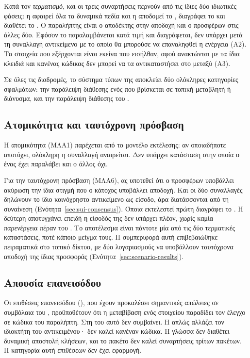 Κατά τον \emph{τερματισμό}, και οι τρεις συναρτήσεις περνούν από τις ίδιες δύο ιδιωτικές
φάσεις: η  αφαιρεί όλα τα δυναμικά πεδία και η 
αποδομεί το , διαγράφει το  και διαθέτει το . Ο παραλήπτης είναι ο αποδέκτης στην αποδοχή και ο προσφέρων στις άλλες
δύο. Εφόσον το  παραλαμβάνεται κατά τιμή και διαγράφεται, δεν υπάρχει μετά τη
συναλλαγή αντικείμενο με το οποίο θα μπορούσε να επαναληφθεί η ενέργεια (Α2). Τα στοιχεία
που εξέρχονται είναι εκείνα που εισήλθαν, αφού ανακτώνται με τα ίδια κλειδιά και κανένας
κώδικας δεν μπορεί να τα αντικαταστήσει στο μεταξύ (Α3).

Σε όλες τις διαδρομές, το σύστημα τύπων της  αποκλείει δύο ολόκληρες κατηγορίες
σφαλμάτων: την παράλειψη διάθεσης ενός  που βρίσκεται σε τοπική μεταβλητή ή
διάνυσμα, και την παράλειψη διάθεσης του .

\subsection{Ατομικότητα και ταυτόχρονη πρόσβαση}

Η ατομικότητα (ΜΛΑ1) παρέχεται από το μοντέλο εκτέλεσης: αν οποιαδήποτε 
αποτύχει, ολόκληρη η συναλλαγή αναιρείται. Δεν υπάρχει κατάσταση στην οποία ο ένας έχει
παραλάβει και ο άλλος όχι.

Για την ταυτόχρονη πρόσβαση (ΜΛΑ6), ας υποτεθεί ότι ο προσφέρων υποβάλλει ακύρωση την ίδια
στιγμή που ο κάτοχος υποβάλλει αποδοχή. Και οι δύο συναλλαγές δηλώνουν το ίδιο κοινόχρηστο
αντικείμενο ως είσοδο, άρα διατάσσονται από τη συναίνεση
(Ενότητα~\ref{sec:sui-consensus}). Όποια εκτελεστεί πρώτη διαγράφει το . Η
δεύτερη αποτυγχάνει επειδή η είσοδός της δεν υπάρχει πλέον, χωρίς καμία παρενέργεια πέραν
του . Το αποτέλεσμα είναι πάντοτε μία από τις δύο τερματικές καταστάσεις, ποτέ
κάποιο μείγμα τους. Η συμπεριφορά αυτή επιβεβαιώθηκε πειραματικά στο τοπικό δίκτυο, με δύο
λογαριασμούς να υποβάλλουν ταυτόχρονα αποδοχή της ίδιας προσφοράς
(Ενότητα~\ref{sec:scenario-results}).

\subsection{Απουσία επανεισόδου}

Οι επιθέσεις επανεισόδου (), που έχουν προκαλέσει σημαντικές απώλειες σε
συμβόλαια του , προϋποθέτουν ότι η μεταβίβαση ενός στοιχείου παραδίδει τον
έλεγχο σε κώδικα του παραλήπτη. Στη  του  αυτό δεν συμβαίνει. Η
 απλώς αλλάζει τον ιδιοκτήτη του αντικειμένου· δεν καλεί
κανέναν κώδικα. Η γλώσσα δεν διαθέτει δυναμική αποστολή κλήσεων, και το πακέτο δεν
καλεί συναρτήσεις τρίτων πακέτων. Η κατηγορία αυτή επιθέσεων δεν έχει εφαρμογή.

